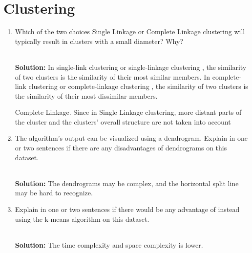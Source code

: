 
\section{Clustering}

\begin{enumerate}
\item Which of the two choices Single Linkage or Complete Linkage clustering will typically result in clusters with a small diameter? Why?

\ \\{\bf Solution:} In single-link clustering or single-linkage clustering , the similarity of two clusters is the similarity of their most similar members. In complete-link clustering or complete-linkage clustering , the similarity of two clusters is the similarity of their most dissimilar members.

Complete Linkage. Since in Single Linkage clustering, more distant parts of the cluster and the clusters' overall structure are not taken into account

\item The algorithm's output can be visualized using a dendrogram. Explain in one or two sentences if there are any disadvantages of dendrograms on this dataset.

\ \\{\bf Solution:} The dendrograms may be complex, and the horizontal split line may be hard to recognize.

\item Explain in one or two sentences if there would be any advantage of instead using the k-means algorithm on this dataset.

\ \\{\bf Solution:} The time complexity and space complexity is lower.

\end{enumerate}